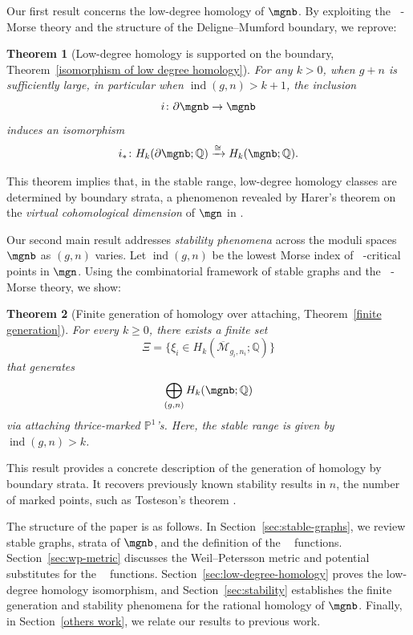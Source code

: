 \documentclass[12pt]{amsart}
\newtheorem{theorem}{Theorem}[section]
\theoremstyle{remark}
\theoremstyle{definition}
\DeclareMathOperator{\ind}{ind}
\DeclareMathOperator{\syst}{sys_T}
\numberwithin{equation}{section}
\begin{document}
Our first result concerns the low-degree homology of $\mgnb$. By exploiting the $\syst$-Morse theory and the structure of the Deligne--Mumford boundary, we reprove:

\begin{theorem}[Low-degree homology is supported on the boundary, Theorem~\ref{isomorphism of low degree homology}]
    For any $k>0$, when $g+n$ is sufficiently large, in particular when $\ind(g,n)>k+1$, the inclusion
    \[
    i\colon \partial\mgnb\to\mgnb
    \]
    induces an isomorphism
    \[
    i_*\colon H_k(\partial \mgnb;\mathbb Q) \xrightarrow{\cong} H_k(\mgnb;\mathbb Q).
    \]
\end{theorem}

This theorem implies that, in the stable range, low-degree homology classes are determined by boundary strata, a phenomenon revealed by Harer's theorem on the \emph{virtual cohomological dimension} of $\mgn$ in \cite{harer1986virtual}.

Our second main result addresses \emph{stability phenomena} across the moduli spaces $\mgnb$ as $(g,n)$ varies. Let $\ind(g,n)$ be the lowest Morse index of $\syst$-critical points in $\mgn$. Using the combinatorial framework of stable graphs and the $\syst$-Morse theory, we show:

\begin{theorem}[Finite generation of homology over attaching, Theorem~\ref{finite generation}]
    For every $k\ge0$, there exists a finite set
    \[
    \Xi=\{\xi_i\in H_k(\overline{\mathcal M}_{g_i,n_i};\mathbb Q)\}
    \]
    that generates
    \[
    \bigoplus_{(g,n)} H_k(\mgnb;\mathbb Q)
    \]
    via attaching thrice-marked $\mathbb P^1$'s. Here, the stable range is given by $\ind(g,n)>k$.
\end{theorem}

This result provides a concrete description of the generation of homology by boundary strata. It recovers previously known stability results in $n$, the number of marked points, such as Tosteson's theorem \cite{tosteson2021stability}. 

The structure of the paper is as follows. In Section~\ref{sec:stable-graphs}, we review stable graphs, strata of $\mgnb$, and the definition of the $\syst$ functions. Section~\ref{sec:wp-metric} discusses the Weil--Petersson metric and potential substitutes for the $\syst$ functions. Section~\ref{sec:low-degree-homology} proves the low-degree homology isomorphism, and Section~\ref{sec:stability} establishes the finite generation and stability phenomena for the rational homology of $\mgnb$. Finally, in Section~\ref{others work}, we relate our results to previous work.
\end{document}
